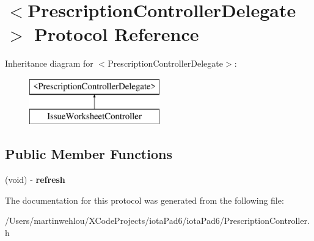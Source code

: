 \hypertarget{protocol_prescription_controller_delegate-p}{
\section{$<$PrescriptionControllerDelegate$>$ Protocol Reference}
\label{protocol_prescription_controller_delegate-p}
}
Inheritance diagram for $<$PrescriptionControllerDelegate$>$:\begin{figure}[H]
\begin{center}
\leavevmode
\includegraphics[height=2.000000cm]{protocol_prescription_controller_delegate-p}
\end{center}
\end{figure}
\subsection*{Public Member Functions}
\begin{DoxyCompactItemize}
\item 
\hypertarget{protocol_prescription_controller_delegate-p_a942de2bca73f58cc879fb1d5b0f0deb1}{
(void) -\/ {\bfseries refresh}}
\label{protocol_prescription_controller_delegate-p_a942de2bca73f58cc879fb1d5b0f0deb1}

\end{DoxyCompactItemize}


The documentation for this protocol was generated from the following file:\begin{DoxyCompactItemize}
\item 
/Users/martinwehlou/XCodeProjects/iotaPad6/iotaPad6/PrescriptionController.h\end{DoxyCompactItemize}
